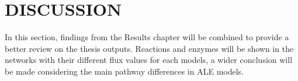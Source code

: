\chapter{DISCUSSION}
In this section, findings from the Results chapter will be combined to provide a better review on the thesis outputs. Reactions and enzymes will be shown in the networks with their different flux values for each models, a wider conclusion will be made considering the main pathway differences in ALE models.
